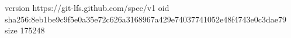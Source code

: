 version https://git-lfs.github.com/spec/v1
oid sha256:8eb1be9c9f5e0a35e72c626a3168967a429e74037741052e48f4743e0c3dae79
size 175248
